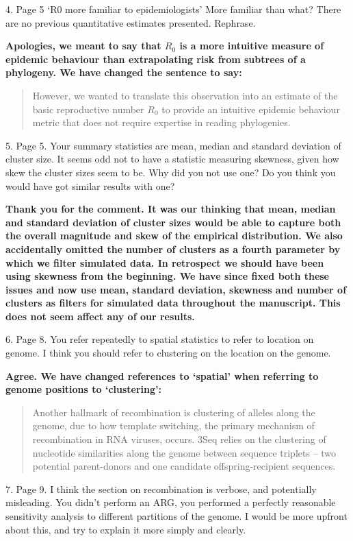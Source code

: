 \documentclass[11pt,oneside,letterpaper]{article}
\begin{document}
4. Page 5 `R0 more familiar to epidemiologists' More familiar than what? There are no previous quantitative estimates presented. Rephrase.

\textbf{Apologies, we meant to say that $R_{0}$ is a more intuitive measure of epidemic behaviour than extrapolating risk from subtrees of a phylogeny. We have changed the sentence to say:}

\begin{quotation}
However, we wanted to translate this observation into an estimate of the basic reproductive number $R_{0}$ to provide an intuitive epidemic behaviour metric that does not require expertise in reading phylogenies.
\end{quotation}

5. Page 5. Your summary statistics are mean, median and standard deviation of cluster size. It seems odd not to have a statistic measuring skewness, given how skew the cluster sizes seem to be. Why did you not use one? Do you think you would have got similar results with one?

\textbf{Thank you for the comment. It was our thinking that mean, median and standard deviation of cluster sizes would be able to capture both the overall magnitude and skew of the empirical distribution. We also accidentally omitted the number of clusters as a fourth parameter by which we filter simulated data. In retrospect we should have been using skewness from the beginning. We have since fixed both these issues and now use mean, standard deviation, skewness and number of clusters as filters for simulated data throughout the manuscript. This does not seem affect any of our results.}

6. Page 8. You refer repeatedly to spatial statistics to refer to location on genome. I think you should refer to clustering on the location on the genome.

\textbf{Agree. We have changed references to `spatial' when referring to genome positions to `clustering':}

\begin{quotation}
Another hallmark of recombination is clustering of alleles along the genome, due to how template switching, the primary mechanism of recombination in RNA viruses, occurs.
3Seq relies on the clustering of nucleotide similarities along the genome between sequence triplets -- two potential parent-donors and one candidate offspring-recipient sequences.
\end{quotation}

7. Page 9. I think the section on recombination is verbose, and potentially misleading. You didn't perform an ARG, you performed a perfectly reasonable sensitivity analysis to different partitions of the genome. I would be more upfront about this, and try to explain it more simply and clearly.
\end{document}
